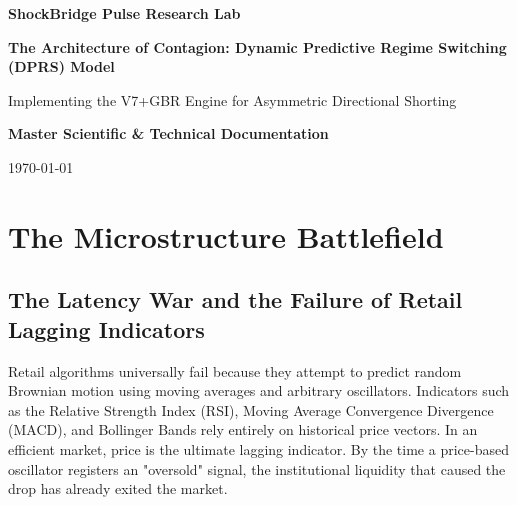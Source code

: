 \documentclass[11pt,a4paper]{report}
\begin{document}
\begin{titlepage}
    \centering
    \vspace*{3cm}
    {\Huge\bfseries ShockBridge Pulse Research Lab\par}
    \vspace{2cm}
    {\Huge\bfseries The Architecture of Contagion: Dynamic Predictive Regime Switching (DPRS) Model\par}
    \vspace{1.5cm}
    {\Large Implementing the V7+GBR Engine for Asymmetric Directional Shorting\par}
    \vspace{3cm}
    {\Large \textbf{Master Scientific \& Technical Documentation}\par}
    \vfill
    {\large \today\par}
\end{titlepage}

\begin{abstract}
\noindent The ShockBridge Pulse Research Lab presents a novel quantitative framework, the Dynamic Predictive Regime Switching (DPRS) Model, engineered specifically to hunt and capitalize on high-velocity contagion events in the cryptocurrency markets. By categorically rejecting retail-level lagging indicators and fictitious data, this research establishes the Bitcoin derivatives funding rate as a deterministic 45-minute oracle for macro liquidity panic. We detail the empirical validation of this contagion matrix across structurally fragile, high-beta altcoins (Avalanche and Solana). Our apex architecture, the V7+GBR Engine, successfully maps localized `$3\\sigma`$ standard deviations in derivatives funding to real-time panic probabilities, triggering asymmetric directional shorts. Over a continuous 194,666 interval (5-year) empirical simulation, the V7+GBR effectively isolated the alpha decay caused by exchange fee constraints, strictly activating upon the mathematically rigorous 11.0\% Profitability Threshold.
\end{abstract}

\tableofcontents
\newpage
\onehalfspacing

\chapter{The Microstructure Battlefield}
\section{The Latency War and the Failure of Retail Lagging Indicators}
Retail algorithms universally fail because they attempt to predict random Brownian motion using moving averages and arbitrary oscillators. Indicators such as the Relative Strength Index (RSI), Moving Average Convergence Divergence (MACD), and Bollinger Bands rely entirely on historical price vectors. In an efficient market, price is the ultimate lagging indicator. By the time a price-based oscillator registers an "oversold" signal, the institutional liquidity that caused the drop has already exited the market.
\end{document}
